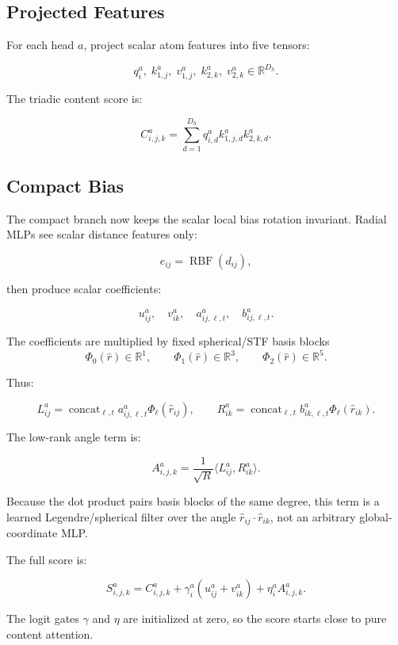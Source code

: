 \documentclass[11pt]{article}
\begin{document}
\subsection{Projected Features}

For each head \(a\), project scalar atom features into five tensors:

\[
  q_i^a,\; k_{1,j}^a,\; v_{1,j}^a,\; k_{2,k}^a,\; v_{2,k}^a
  \in \mathbb{R}^{D_h}.
\]

The triadic content score is:

\[
  C^a_{i,j,k}
  =
  \sum_{d=1}^{D_h}
  q^a_{i,d}
  k^a_{1,j,d}
  k^a_{2,k,d}.
\]

\subsection{Compact Bias}

The compact branch now keeps the scalar local bias rotation invariant.  Radial
MLPs see scalar distance features only:

\[
  e_{ij}
  =
  \operatorname{RBF}(d_{ij}),
\]

then produce scalar coefficients:

\[
  u^a_{ij},\quad v^a_{ik},\quad
  a^a_{ij,\ell,t},\quad b^a_{ij,\ell,t}.
\]

The coefficients are multiplied by fixed spherical/STF basis blocks
\[
  \Phi_0(\hat r)\in\mathbb{R}^{1},
  \qquad
  \Phi_1(\hat r)\in\mathbb{R}^{3},
  \qquad
  \Phi_2(\hat r)\in\mathbb{R}^{5}.
\]

Thus:

\[
  L^a_{ij}
  =
  \operatorname{concat}_{\ell,t}
  a^a_{ij,\ell,t}\Phi_\ell(\hat r_{ij}),
  \qquad
  R^a_{ik}
  =
  \operatorname{concat}_{\ell,t}
  b^a_{ik,\ell,t}\Phi_\ell(\hat r_{ik}).
\]

The low-rank angle term is:

\[
  A^a_{i,j,k}
  =
  \frac{1}{\sqrt{R}}
  \langle L^a_{ij}, R^a_{ik}\rangle.
\]

Because the dot product pairs basis blocks of the same degree, this term is a
learned Legendre/spherical filter over the angle
\(\hat r_{ij}\cdot\hat r_{ik}\), not an arbitrary global-coordinate MLP.

The full score is:

\[
  S^a_{i,j,k}
  =
  C^a_{i,j,k}
  +
  \gamma^a_i
  \left(u^a_{ij}+v^a_{ik}\right)
  +
  \eta^a_i A^a_{i,j,k}.
\]

The logit gates \(\gamma\) and \(\eta\) are initialized at zero, so the score
starts close to pure content attention.
\end{document}
